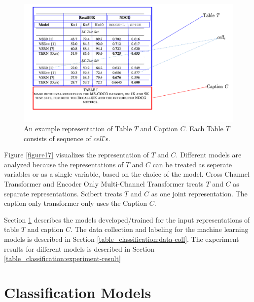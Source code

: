 \begin{figure}[h]
    \centering
    \includegraphics[width=\maxwidth{\textwidth}]{src/images/table-structure.pdf}
    \caption{An example representation of Table $T$ and Caption $C$. Each Table $T$ consists of sequence of $cell$'s. }
    \label{figure\arabic{figurecounter}}
\end{figure}

Figure \ref{figure17} visualizes the representation of $T$ and $C$. Different models are analyzed because the representations of $T$ and $C$ can be treated as seperate variables or as a single variable, based on the choice of the model. Cross Channel Transformer and Encoder Only Multi-Channel Transformer treats $T$ and $C$ as separate representations. Scibert treats $T$ and $C$ as one joint representation. The caption only transformer only uses the Caption $C$. 

Section \ref{table_classification:models} describes the models developed/trained for the input representations of table $T$ and caption $C$. The data collection and labeling for the machine learning models is described in Section \ref{table_classification:data-coll}. The experiment results for different models is described in Section \ref{table_classification:experiment-result}

\section{Classification Models}
\label{table_classification:models}

